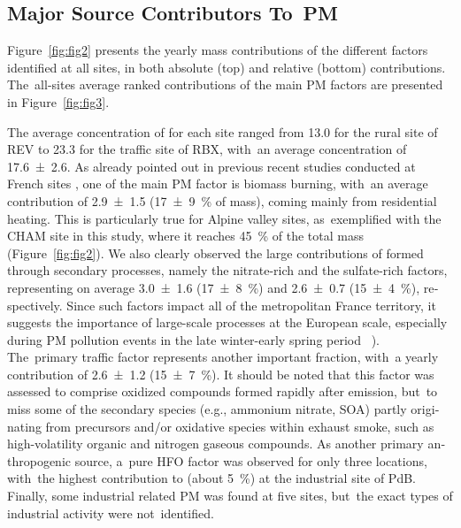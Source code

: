 \begin{otherlanguage}{english}
\subsection{Major Source Contributors To~PM}%
\label{sub:major_source_contributors_to_pm}

Figure~\ref{fig:fig2} presents the yearly mass contributions of the different factors
identified at all sites, in both   absolute (top) and relative 
(bottom) contributions. The~all-sites average ranked contributions of the main PM factors are
presented in Figure~\ref{fig:fig3}.

The average concentration of \PM{} for each site ranged from \SI{13.0}{\concum} for the
rural site of REV to \SI{23.3}{\concum} for the traffic site of RBX, with~an average
concentration of \SI{17.6\pm2.6}{\concum}.  As already pointed out in previous recent
studies conducted at French sites
\autocite{wakedSource2014,bressiSources2014,petitSubmicron2014,salamehSources2018,srivastavaSpeciation2018,weberApportionment2018},
one of the main PM factor is biomass burning, with~an average contribution of
\SI{2.9\pm1.5}{\concum} (\SI{17\pm9}{\%} of \PM{} mass), coming mainly from residential
heating. This is particularly true for Alpine valley sites, as~exemplified with the CHAM
site in this study, where it reaches \SI{45}{\percent} of the total \PM{} mass
(Figure~\ref{fig:fig2}). We also clearly observed the large contributions of \PM{} formed
through secondary processes, namely the nitrate-rich and the sulfate-rich factors,
representing on average \SI{3.0\pm1.6}{\concum} (\SI{17\pm8}{\percent}) and
\SI{2.6\pm0.7}{\concum} (\SI{15\pm4}{\percent}), respectively. Since such factors impact
all of the metropolitan France territory, it   suggests  the importance of large-scale
processes at the European scale,  especially during PM pollution events in the late
winter-early spring period
~\autocite{petitTwo2015,petitBlack2017,srivastavaSpeciation2018}).  The~primary traffic
factor represents another important fraction, with~a yearly contribution of
\SI{2.6\pm1.2}{\concum} (\SI{15\pm7}{\percent}).  It should be noted that this factor was
assessed to comprise oxidized compounds formed rapidly after emission, but~to miss some of
the secondary species (e.g., ammonium nitrate, SOA) partly originating from precursors
and/or oxidative species within exhaust smoke, such as high-volatility organic and
nitrogen gaseous compounds.  As another primary anthropogenic source, a~pure HFO factor
was observed for only  three  locations, with~the highest contribution to \PM{} (about
\SI{5}{\percent}) at the industrial site of PdB.  Finally, some industrial related PM was
found  at  five  sites, but~the exact types of industrial activity were not~identified.


\end{otherlanguage}
